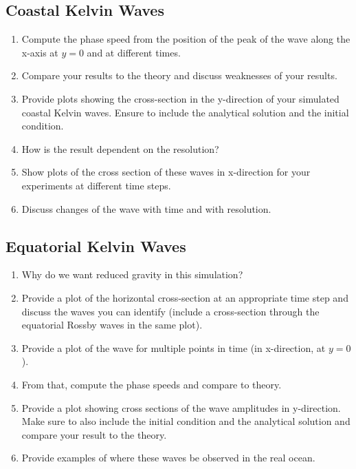 \begin{question}
\subsection*{Coastal Kelvin Waves}

\begin{enumerate}

\item Compute the phase speed from the position of the peak of the wave along the x-axis at $y=0$ and at different times.

\item Compare your results to the theory and discuss weaknesses of your results.

\item Provide plots showing the cross-section in the y-direction of your simulated coastal Kelvin waves. Ensure to include the analytical solution and the initial condition.

\item How is the result dependent on the resolution?

\item Show plots of the cross section of these waves in x-direction for your experiments at different time steps.

\item Discuss changes of the wave with time and with resolution.

\end{enumerate}


\subsection*{Equatorial Kelvin Waves}

\begin{enumerate}

\item Why do we want reduced gravity in this simulation?

\item Provide a plot of the horizontal cross-section at an appropriate time step and discuss the waves you can identify (include a cross-section through the equatorial Rossby waves in the same plot).

\item Provide a plot of the wave for multiple points in time (in x-direction, at $y=0$).

\item From that, compute the phase speeds and compare to theory.

\item Provide a plot showing cross sections of the wave amplitudes in y-direction. Make sure to also include the initial condition and the analytical solution and compare your result to the theory.

\item Provide examples of where these waves be observed in the real ocean.

\end{enumerate}
\end{question}